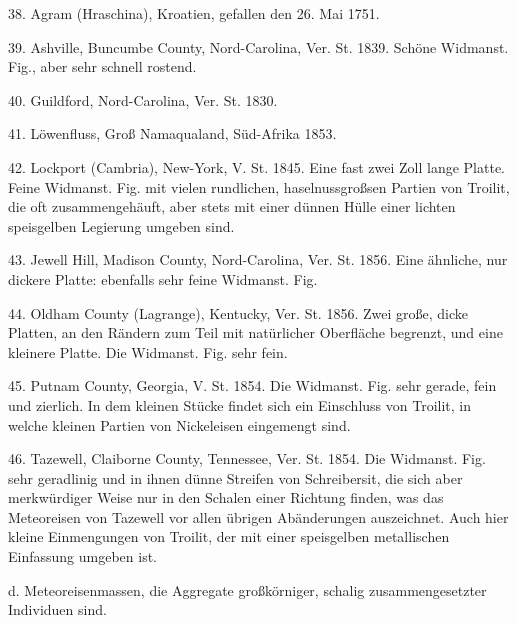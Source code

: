 \documentclass[a4paper, 11pt, oneside]{article}
\begin{document}
38. Agram (Hraschina), Kroatien, gefallen den 26. Mai 1751.

39. Ashville, Buncumbe County, Nord-Carolina, Ver. St. 1839. Schöne Widmanst. Fig., aber sehr schnell rostend.

40. Guildford, Nord-Carolina, Ver. St. 1830.

41. Löwenfluss, Groß Namaqualand, Süd-Afrika 1853.

42. Lockport (Cambria), New-York, V. St. 1845. Eine fast zwei Zoll lange Platte. Feine Widmanst. Fig. mit vielen rundlichen, haselnussgroßsen Partien von Troilit, die oft zusammengehäuft, aber stets mit einer dünnen Hülle einer lichten speisgelben Legierung umgeben sind.

43. Jewell Hill, Madison County, Nord-Carolina, Ver. St. 1856. Eine ähnliche, nur dickere Platte: ebenfalls sehr feine Widmanst. Fig.

44. Oldham County (Lagrange), Kentucky, Ver. St. 1856. Zwei große, dicke Platten, an den Rändern zum Teil mit natürlicher Oberfläche begrenzt, und eine kleinere Platte. Die Widmanst. Fig. sehr fein.

45. Putnam County, Georgia, V. St. 1854. Die Widmanst. Fig. sehr gerade, fein und zierlich. In dem kleinen Stücke findet sich ein Einschluss von Troilit, in welche kleinen Partien von Nickeleisen eingemengt sind.

46. Tazewell, Claiborne County, Tennessee, Ver. St. 1854. Die Widmanst. Fig. sehr geradlinig und in ihnen dünne Streifen von Schreibersit, die sich aber merkwürdiger Weise nur in den Schalen einer Richtung finden, was das Meteoreisen von Tazewell vor allen übrigen Abänderungen auszeichnet. Auch hier kleine Einmengungen von Troilit, der mit einer speisgelben metallischen Einfassung umgeben ist.

d. Meteoreisenmassen, die Aggregate großkörniger, schalig zusammengesetzter Individuen sind.
\end{document}
